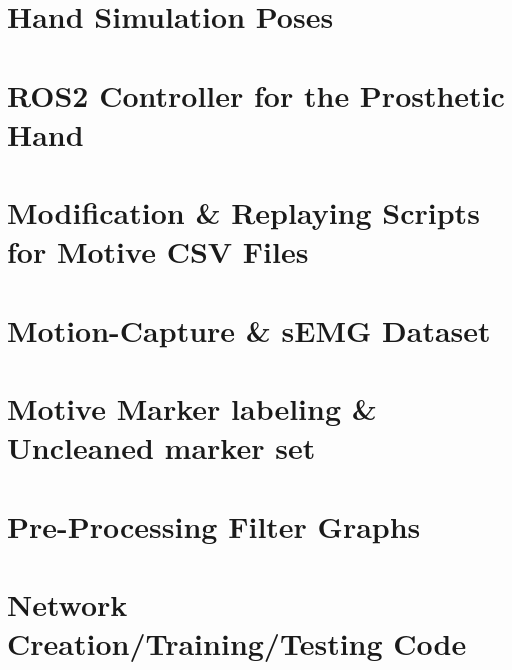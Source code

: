 \documentclass[a4paper, 12pt]{article}
\begin{document}
\section{Hand Simulation Poses}
\label{appendix:handsim_poses}

\section{ROS2 Controller for the Prosthetic Hand}
\label{appendix:roscontrol}

\section{Modification \& Replaying Scripts for Motive CSV Files}
\label{appendix:motiveformatting}

\section{Motion-Capture \& sEMG Dataset}
\label{appendix:dataset}

\section{Motive Marker labeling \& Uncleaned marker set}
\label{appendix:motivefixing}

\section{Pre-Processing Filter Graphs}
\label{appendix:preprocessing}

\section{Network Creation/Training/Testing Code}
\label{appendix:networks}
\end{document}
